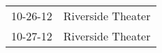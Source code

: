 \begin{supertabular}{p{0.25\columnwidth}p{0.75\columnwidth}}
 10-26-12 &  Riverside Theater \\
 10-27-12 &  Riverside Theater \\
\end{supertabular}

